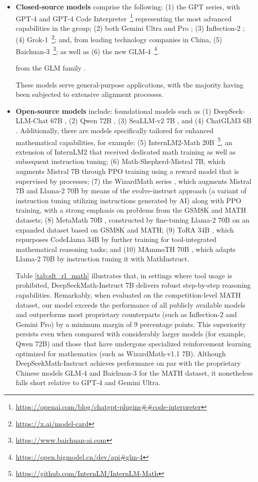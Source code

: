 \begin{itemize}[topsep=0pt]
\begin{itemize}[topsep=0pt]
    \item \textbf{Closed-source models} comprise the following: (1) the GPT series, with GPT-4 \citep{gpt4} and GPT-4 Code Interpreter~\footnote{\url{https://openai.com/blog/chatgpt-plugins\#\#code-interpreter}} representing the most advanced capabilities in the group; (2) both Gemini Ultra and Pro \citep{gemini}; (3) Inflection-2 \citep{inflection-2}; (4) Grok-1~\footnote{\url{https://x.ai/model-card}}; and, from leading technology companies in China, (5) Baichuan-3~\footnote{\url{https://www.baichuan-ai.com}}; as well as (6) the new GLM-4~\footnote{\url{https://open.bigmodel.cn/dev/api\#glm-4}}.

    from the GLM family \citep{glm}.

These models serve general-purpose applications, with the majority having been subjected to extensive alignment processes.

\item \textbf{Open-source models} include: foundational models such as (1) DeepSeek-LLM-Chat 67B \citep{deepseek-llm}, (2) Qwen 72B \citep{qwen}, (3) SeaLLM-v2 7B \citep{seallm}, and (4) ChatGLM3 6B \citep{chatglm3}. Additionally, there are models specifically tailored for enhanced mathematical capabilities, for example: (5) InternLM2-Math 20B~\footnote{\url{https://github.com/InternLM/InternLM-Math}}, an extension of InternLM2 that received dedicated math training as well as subsequent instruction tuning; (6) Math-Shepherd-Mistral 7B, which augments Mistral 7B \citep{mistral} through PPO training \citep{schulman2017proximal} using a reward model that is supervised by processes; (7) the WizardMath series \citep{wizardmath}, which augments Mistral 7B and Llama-2 70B \citep{llama2} by means of the evolve-instruct approach (a variant of instruction tuning utilizing instructions generated by AI) along with PPO training, with a strong emphasis on problems from the GSM8K and MATH datasets; (8) MetaMath 70B \citep{metamath}, constructed by fine-tuning Llama-2 70B on an expanded dataset based on GSM8K and MATH; (9) ToRA 34B \cite{tora}, which repurposes CodeLlama 34B by further training for tool-integrated mathematical reasoning tasks; and (10) MAmmoTH 70B \citep{MathInstruct}, which adapts Llama-2 70B by instruction tuning it with MathInstruct.

Table \ref{tab:sft_rl_math} illustrates that, in settings where tool usage is prohibited, DeepSeekMath-Instruct 7B delivers robust step-by-step reasoning capabilities. Remarkably, when evaluated on the competition-level MATH dataset, our model exceeds the performance of all publicly available models and outperforms most proprietary counterparts (such as Inflection-2 and Gemini Pro) by a minimum margin of 9 percentage points. This superiority persists even when compared with considerably larger models (for example, Qwen 72B) and those that have undergone specialized reinforcement learning optimized for mathematics (such as WizardMath-v1.1 7B). Although DeepSeekMath-Instruct achieves performance on par with the proprietary Chinese models GLM-4 and Baichuan-3 for the MATH dataset, it nonetheless falls short relative to GPT-4 and Gemini Ultra.


\end{itemize}
\end{itemize}
